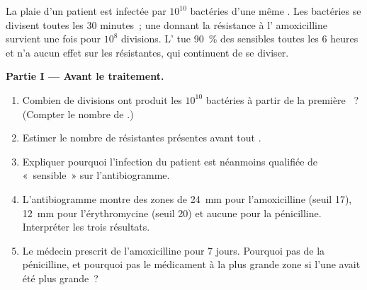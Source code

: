 \begin{problem}
\label{pb:g11:antibiotic-resistance:1}
La plaie d'un patient est infectée par $10^{10}$ bactéries d'une même
. Les bactéries se divisent toutes les 30 minutes~; une 
donnant la résistance à l' amoxicilline survient une fois
pour $10^8$ divisions. L' tue 90~\% des  sensibles
toutes les 6 heures et n'a aucun effet sur les  résistantes,
qui continuent de se diviser.

\medskip
\noindent\textbf{Partie I --- Avant le traitement.}
\begin{enumerate}
  \item Combien de divisions ont produit les $10^{10}$ bactéries à
        partir de la première ~? (Compter le nombre de
        .)
  \item Estimer le nombre de  résistantes présentes avant tout
        .
  \item Expliquer pourquoi l'infection du patient est néanmoins
        qualifiée de «~sensible~» sur l'antibiogramme.
  \item L'antibiogramme montre des zones de \qty{24}{mm} pour
        l'amoxicilline (seuil 17), \qty{12}{mm} pour l'érythromycine
        (seuil 20) et aucune pour la pénicilline. Interpréter les trois
        résultats.
  \item Le médecin prescrit de l'amoxicilline pour 7 jours. Pourquoi
        pas de la pénicilline, et pourquoi pas le médicament à la plus
        grande zone si l'une avait été plus grande~?
\end{enumerate}


\end{problem}
